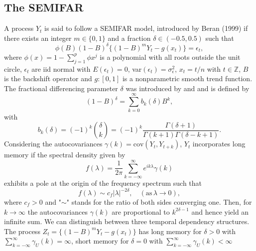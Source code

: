 \documentclass[12pt]{article}
\begin{document}
\subsection{The SEMIFAR}
A process \(Y_{t}\) is said to follow a SEMIFAR model, introduced by Beran (1999)
if there exists an integer \(m \in \{0,1\}\) and a fraction \(\delta\in (-0.5,0.5) \) such that 
\begin{equation}
\label{M1}
\phi(B)(1-B)^{\delta} \{(1-B)^m Y_t - g(x_t)\}= \epsilon_t,
\end{equation} 
where \(\phi(x) = 1 - \sum_{j=1}^{p} \phi x^{j} \) is a polynomial with all roots outside the unit circle, \( \epsilon_t \) are iid normal with \(E(\epsilon_t) = 0\), var\((\epsilon_t) = \sigma_{\epsilon}^{2} \),  \(x_t = t/n\)  with \( t \in \mathbb{Z} \), $B$ is the backshift operator and  \(g:[0,1]\) is a nonparametric smooth trend function. The fractional differencing parameter \( \delta \) was introduced by \textcite{granger1980introduction} and \textcite{hosking1981fractional} and is defined by 
\begin{equation}
\label{eq:fractional difference 1}
(1-B)^{\delta} = \sum_{k=0}^{\infty} b_k(\delta) B^k, 
\end{equation} 
with
\begin{equation}
\label{eq:fractional difference 2}
b_k(\delta) = (-1)^{k}{\delta\choose k}  = (-1)^{k} \frac{\Gamma(\delta+1)}{\Gamma(k+1)\Gamma(\delta-k+1)}. 
\end{equation} 
Considering the autocovariances \(\gamma(k) = \text{cov}(Y_t,Y_{t+k})\), \(Y_t\) incorporates long memory if the spectral density  given by
\begin{equation}
\label{eq:long memory1}
f(\lambda) = \frac{1}{2 \pi} \sum_{k=-\infty}^{\infty} e^{i k \lambda} \gamma(k) 
\end{equation}
exhibits a pole at the origin of the frequency spectrum such that
\begin{equation}
\label{eq:long memory2}
f(\lambda) \sim c_f |\lambda|^{-2\delta}, \quad (\text{as}\, \lambda \rightarrow 0),
\end{equation}
where \(c_f > 0\)  and "\(\sim\)" stands for the ratio of both sides converging one. 
Then, for \(k \rightarrow \infty\) the autocovariances \( \gamma(k) \) are proportional to \(k^{2\delta - 1}\) and hence yield an infinite sum. We can distinguish between three temporal dependency structures. The process $Z_t = \{(1-B)^m Y_t - g(x_t)\}$  has long memory for \(\delta > 0\) with \( \sum_{k=-\infty}^{\infty} \gamma_{U}(k) = \infty  \), short memory for \(\delta = 0\) with \( \sum_{k=-\infty}^{\infty} \gamma_{U}(k) < \infty  \)
\end{document}
